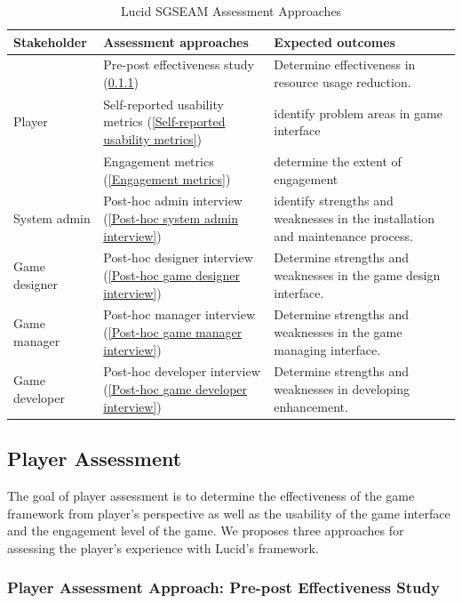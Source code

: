 \documentclass[11pt,oneside]{book}
\newcommand\tabhead[1]{\small\textbf{#1}}
\begin{document}
\begin{table}[ht!]
  \centering
  \begin{tabular}{|p{}|p{}|p{}|}
    \hline
    \tabhead{Stakeholder}&
    \tabhead{Assessment approaches}&
    \tabhead{Expected outcomes } \\
    \hline
    \multirow{3}{*}{Player}&
    	Pre-post effectiveness study (\ref{Pre-Post effectiveness study}) &
	Determine effectiveness in resource usage reduction.\\\cline{2-3}
        &
	Self-reported usability metrics (\ref{Self-reported usability metrics}) &
	identify problem areas in game interface\\\cline{2-3}
        &
	Engagement metrics (\ref{Engagement metrics}) &
	determine the extent of engagement\\
    \hline
    System admin&
    	Post-hoc admin interview (\ref{Post-hoc system admin interview}) &
	identify strengths and weaknesses in the installation and maintenance process.\\
    \hline
    Game designer&
    	Post-hoc designer interview (\ref{Post-hoc game designer interview}) &
	Determine strengths and weaknesses in the game design interface.\\
    \hline
    Game manager&
    	Post-hoc manager interview (\ref{Post-hoc game manager interview}) &
	Determine strengths and weaknesses in the game managing interface.\\
    \hline
    Game developer&
    	Post-hoc developer interview (\ref{Post-hoc game developer interview}) &
	Determine strengths and weaknesses in developing enhancement.\\
    \hline
  \end{tabular}
  \caption{Lucid SGSEAM Assessment Approaches}
  \label{table:approaches}
\end{table}
      
\subsection{Player Assessment}

The goal of player assessment is to determine the effectiveness of the game
framework from player's perspective as well as the usability of the game interface and the engagement level of the game. 
We proposes three approaches for assessing the player's experience with Lucid's framework.

\subsubsection{Player Assessment Approach: Pre-post Effectiveness Study}
\label{Pre-Post effectiveness study}
\end{document}
